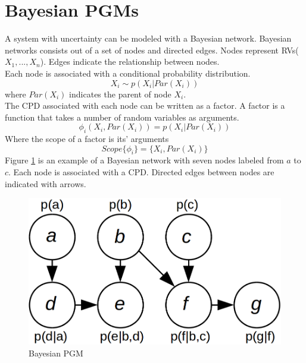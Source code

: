\documentclass[12pt,oneside,openany,a4paper, %
afrikaans,english,
]{memoir}
\numberwithin{equation}{chapter}
\begin{document}
\section{Bayesian PGMs}
A system with uncertainty can be modeled with a Bayesian network. Bayesian networks consists out of a set of nodes and directed edges. Nodes represent RVs($X_1, ..., X_n$). Edges indicate the relationship between nodes.\\
Each node is associated with a conditional probability distribution.
\begin{equation}
X_i \sim p(X_i|Par(X_i))
\end{equation}
where $Par(X_i)$ indicates the parent of node $X_i$.\\
The CPD associated with each node can be written as a factor. A factor is a function that takes a number of random variables as arguments.
\begin{equation}
\phi_i(X_i, Par(X_i)) = p(X_i|Par(X_i))
\end{equation}
Where the scope of a factor is its' arguments
\begin{equation}
Scope\{\phi_i\} = \{X_i, Par(X_i)\}
\end{equation}
Figure \ref{fig:bays_pgm} is an example of a Bayesian network with seven nodes labeled from $a$ to $c$. Each node is associated with a CPD. Directed edges between nodes are indicated with arrows.
\begin{figure}[H]
  \includegraphics[width=0.6\linewidth]{Figures/bayesian_pgm.png}
  \centering
  \caption{Bayesian PGM}
  \label{fig:bays_pgm}
\end{figure}
\end{document}
